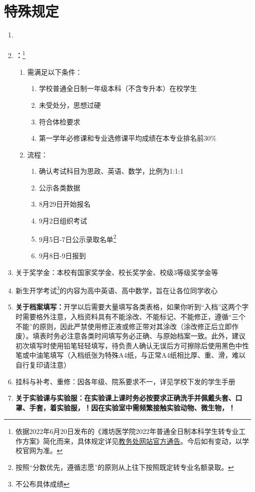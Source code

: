 \section[特殊规定]{特殊规定}
\begin{enumerate}
    \item \textbf{}
    \item \textbf{：}\footnote{依据2022年6月20日发布的《潍坊医学院2022年普通全日制本科学生转专业工作方案》简化而来，具体规定详见\uline{\href{https://jwch.wfmc.edu.cn/2022/0620/c2593a105784/page.htm}{教务处网站官方通告}}。今后如有变动，以学校官网为准。}
          \begin{enumerate}
              \item 需满足以下条件：
                    \begin{enumerate}
                        \item 学校普通全日制一年级本科（不含专升本）在校学生
                        \item 未受处分，思想过硬
                        \item 符合体检要求
                        \item 第一学年必修课和专业选修课平均成绩在本专业排名前30\%
                    \end{enumerate}
              \item 流程：
                    \begin{enumerate}
                        \item 确认考试科目为思政、英语、数学，比例为1:1:1
                        \item 公示各类数据
                        \item 8月29日开始报名
                        \item 9月2日组织考试
                        \item 9月5日-7日公示录取名单\footnote{按照“分数优先，遵循志愿”的原则从上往下按照既定转专业名额录取。}
                        \item 9月8日-9日报到
                    \end{enumerate}
          \end{enumerate}
    \item 关于奖学金：本校有国家奖学金、校长奖学金、校级3等级奖学金等
    \item 新生开学考试\footnote{不公布具体成绩}的内容为高中英语、高中数学，旨在让各位同学收心
    \item \textbf{关于档案填写：}开学以后需要大量填写各类表格，如果你听到“入档”这两个字时需要格外注意，入档资料具有不能涂改、不能标记、不能修正，遵循“三个不能”的原则，因此严禁使用修正液或修正带对其涂改（涂改修正后立即作废）。填表时务必注意各类时间填写务必正确、与原始档案一致。此外，建议初次填写时使用铅笔轻轻填写，待负责人确认无误后方可擦除后使用黑色中性笔或中油笔填写（入档纸张为特殊A4纸，与正常A4纸相比厚、重、滑，难以自行复印请注意）
    \item 挂科与补考、重修：因各年级、院系要求不一，详见学校下发的学生手册
    \item \textbf{关于实验课与实验服：在实验课上课时务必按要求正确洗手并佩戴头套、口罩、手套，着实验服，！因在实验室中需频繁接触实验动物、微生物，！}
\end{enumerate}